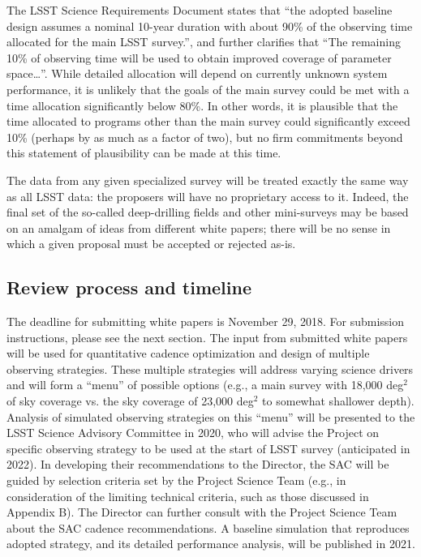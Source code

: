 \documentclass[DM,lsstdraft,toc,usenatbib]{lsstdoc}
\begin{document}
The LSST Science Requirements Document states that ``the adopted baseline design assumes a 
nominal 10-year duration with about 90\% of the observing time allocated for the main LSST survey.'',
and further clarifies that ``The remaining 10\% of observing time will be used to obtain improved 
coverage of parameter space\dots''. While detailed allocation will depend on currently unknown system
performance, it is unlikely that the goals of the main survey could be met with a time allocation
significantly below 80\%. In other words, it is plausible that the time allocated to programs other
than the main survey could significantly exceed 10\% (perhaps by as much as a factor of two), but 
no firm commitments beyond this statement of plausibility can be made at this time. 

The data from any given specialized survey will be treated exactly the same way as all LSST 
data: the proposers will have no proprietary access to it.  Indeed, the final set of the so-called
deep-drilling fields and other mini-surveys may be based on an amalgam of ideas from different 
white papers; there will be no sense in which a given proposal must be accepted or rejected as-is.  


\subsection{Review process and timeline}

The deadline for submitting white papers is November 29, 2018. For submission instructions, 
please see the next section. The input from submitted white papers will be used for quantitative 
cadence optimization and design of multiple observing strategies. These multiple strategies 
will address varying science drivers and will form a ``menu'' of possible options (e.g., a main 
survey with 18,000 deg$^2$ of sky coverage vs. the sky coverage of 23,000 deg$^2$ to 
somewhat shallower depth). Analysis of simulated observing strategies on this ``menu''
will be presented to the LSST Science Advisory Committee in 2020, who will advise the Project 
on specific observing strategy to be used at the start of LSST survey (anticipated in 2022). 
In developing their recommendations to the Director, the SAC will be guided by selection 
criteria set by the Project Science Team  (e.g., in consideration of the limiting technical criteria,
such as those discussed in Appendix B). The Director can further consult with the Project Science 
Team about the SAC cadence recommendations. A baseline simulation that reproduces 
adopted strategy, and its detailed performance analysis, will be published in 2021. 
\end{document}
